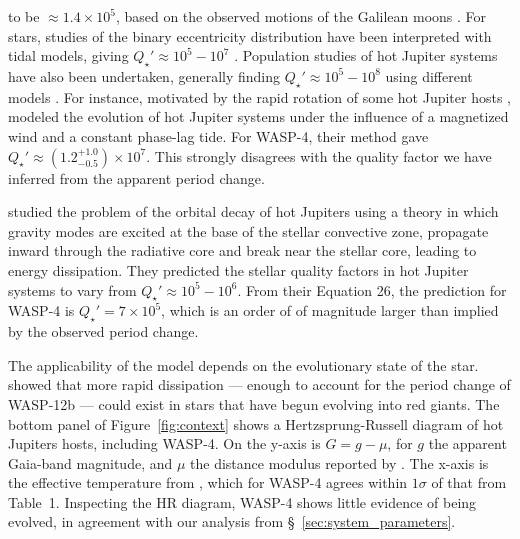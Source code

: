 \documentclass[12pt,twocolumn,tighten]{aastex62}
\begin{document}
to be $\approx$$1.4 \times 10^5$, based on the observed motions of the
Galilean moons \citep{lainey_strong_2009}.  For stars, studies of the
binary eccentricity distribution have been interpreted with tidal
models, giving $Q_\star' \approx 10^5 - 10^7$ \citep[{\it
    e.g.},][]{meibom_robust_2005,belczynski_compact_2008,
  geller_direct_2013,milliman_wiyn_2014}.  Population studies of hot
Jupiter systems have also been undertaken, generally finding $Q_\star'
\approx 10^5 - 10^8$ using different models
\citep{jackson_observational_2009,hansen_calibration_2010,penev_constraining_2012,penev_empirical_2018,cameron_hierarchical_2018}.
For instance, motivated by the rapid rotation of some hot Jupiter
hosts
\citep{pont_empirical_2009,ciceri_hats-15b_2016,penev_hats-18b_2016},
\citet{penev_empirical_2018} modeled the evolution of hot Jupiter
systems under the influence of a magnetized wind and a constant
phase-lag tide.  For WASP-4, their method gave $Q_\star' \approx
(1.2^{+1.0}_{-0.5})\times10^7$.  This strongly disagrees with the
quality factor we have inferred from the apparent period change.

\citet{essick_orbital_2016} studied the problem of the orbital decay
of hot Jupiters using a theory in which gravity modes are excited at
the base of the stellar convective zone, propagate inward through the
radiative core and break near the stellar core, leading to energy
dissipation.  They predicted the stellar quality factors in hot
Jupiter systems to vary from $Q_\star' \approx 10^5 - 10^6$.  From
their Equation 26, the prediction for WASP-4 is $Q_\star' =
7\times10^5$, which is an order of of magnitude larger than implied by
the observed period change.

The applicability of the \citet{essick_orbital_2016} model depends on
the evolutionary state of the star. \citet{weinberg_tidal_2017} showed
that more rapid dissipation --- enough to account for the period
change of WASP-12b --- could exist in stars that have begun evolving
into red giants.  The bottom panel of Figure~\ref{fig:context} shows a
Hertzsprung-Russell diagram of hot Jupiters hosts, including WASP-4.
On the y-axis is $G=g-\mu$, for $g$ the apparent Gaia-band magnitude,
and $\mu$ the distance modulus reported by
\citet{gaia_collaboration_gaia_2018}.  The x-axis is the effective
temperature from \citet{bonomo_gaps_2017}, which for WASP-4 agrees
within $1\sigma$ of that from Table~1.  Inspecting the HR diagram,
WASP-4 shows little evidence of being evolved, in agreement with our
analysis from \S~\ref{sec:system_parameters}.
\end{document}
